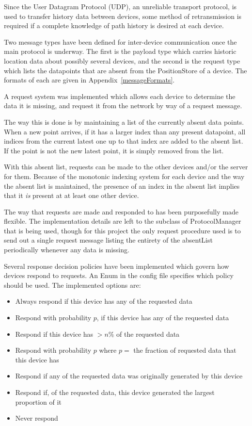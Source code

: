 Since the User Datagram Protocol (UDP), an unreliable transport protocol, is used to transfer history data between devices, some method of retransmission is required if a complete knowledge of path history is desired at each device.

Two message types have been defined for inter-device communication once the main protocol is underway. The first is the payload type which carries historic location data about possibly several devices, and the second is the request type which lists the datapoints that are absent from the PositionStore of a device. The formats of each are given in Appendix~\ref{messageFormats}.

A request system was implemented which allows each device to determine the data it is missing, and request it from the network by way of a request message.

The way this is done is by maintaining a list of the currently absent data points. When a new point arrives, if it has a larger index than any present datapoint, all indices from the current latest one up to that index are added to the absent list. If the point is not the new latest point, it is simply removed from the list.

With this absent list, requests can be made to the other devices and/or the server for them. Because of the monotonic indexing system for each device and the way the absent list is maintained, the presence of an index in the absent list implies that it \emph{is} present at at least one other device.

The way that requests are made and responded to has been purposefully made flexible. The implementation details are left to the subclass of ProtocolManager that is being used, though for this project the only request procedure used is to send out a single request message listing the entirety of the absentList periodically whenever any data is missing.

Several response decision policies have been implemented which govern how devices respond to requests. An Enum in the config file specifies which policy should be used. The implemented options are:
\begin{itemize}
\item{Always respond if this device has any of the requested data}
\item{Respond with probability $p$, if this device has any of the requested data}
\item{Respond if this device has $>n \% $ of the requested data}
\item{Respond with probability $p$ where $p=$ the fraction of requested data that this device has}
\item{Respond if any of the requested data was originally generated by this device}
\item{Respond if, of the requested data, this device generated the largest proportion of it}
\item{Never respond}
\end{itemize}


